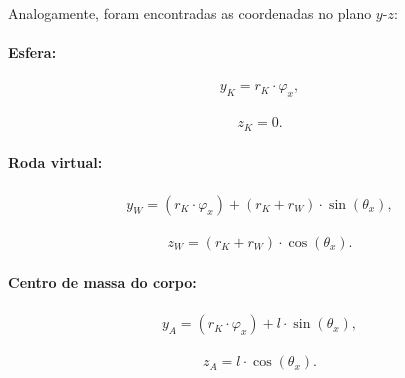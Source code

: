 Analogamente, foram encontradas as coordenadas no plano $y$-$z$:

\paragraph{Esfera:}

\begin{equation}
    \label{eq:8}
    \begin{aligned}
        y_K = r_K \cdot \varphi_x,
    \end{aligned}
\end{equation}

\begin{equation}
    \label{eq:9}
    \begin{aligned}
        z_K = 0.
    \end{aligned}
\end{equation}

\paragraph{Roda virtual:}

\begin{equation}
    \label{eq:10}
    \begin{aligned}
        y_W = (r_K \cdot \varphi_x) + (r_K + r_W) \cdot \sin{(\theta_x)},
    \end{aligned}
\end{equation}

\begin{equation}
    \label{eq:11}
    \begin{aligned}
        z_W = (r_K + r_W) \cdot \cos{(\theta_x)}.
    \end{aligned}
\end{equation}

\paragraph{Centro de massa do corpo:}

\begin{equation}
    \label{eq:12}
    \begin{aligned}
        y_A = (r_K \cdot \varphi_x) + l \cdot \sin{(\theta_x)},
    \end{aligned}
\end{equation}

\begin{equation}
    \label{eq:13}
    \begin{aligned}
        z_A = l \cdot \cos{(\theta_x)}.
    \end{aligned}
\end{equation}

